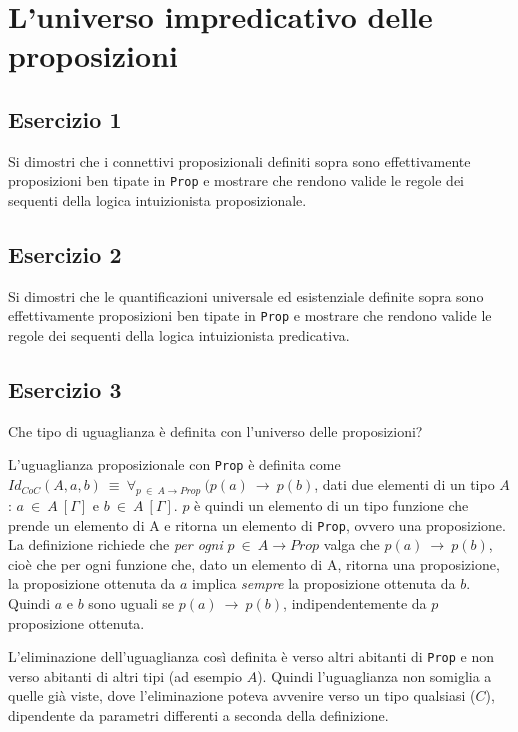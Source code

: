 \newpage
\section{L'universo impredicativo delle proposizioni}
\subsection{Esercizio 1}
\begin{thm}
	Si dimostri che i connettivi proposizionali definiti sopra sono effettivamente proposizioni ben tipate in \texttt{Prop} e mostrare che rendono valide le regole dei sequenti della logica intuizionista proposizionale.
\end{thm}


\subsection{Esercizio 2}
\begin{thm}
	Si dimostri che le quantificazioni universale ed esistenziale definite sopra sono effettivamente proposizioni ben tipate in \texttt{Prop} e mostrare che rendono valide le regole dei sequenti della logica intuizionista predicativa.
\end{thm}


\subsection{Esercizio 3}
\begin{thm}
	Che tipo di uguaglianza è definita con l'universo delle proposizioni?
\end{thm}
L'uguaglianza proposizionale con \texttt{Prop} è definita come $Id_{CoC}(A,a,b)~\equiv~\forall_{p~\in~A\to Prop}~(p(a)~\to~p(b)$, dati due  elementi di un tipo $A$: $a~\in~A~[\Gamma]$ e $b~\in~A~[\Gamma]$. $p$ è quindi un elemento di un tipo funzione che prende un elemento di A e ritorna un elemento di \texttt{Prop}, ovvero una proposizione. La definizione richiede che \textit{per ogni} $p~\in~A\to Prop$ valga che $p(a)~\to~p(b)$, cioè che per ogni funzione che, dato un elemento di A, ritorna una proposizione, la proposizione ottenuta da $a$ implica \textit{sempre} la proposizione ottenuta da $b$. Quindi $a$ e $b$ sono uguali se $p(a)~\to~p(b)$, indipendentemente da $p$ proposizione ottenuta.

L'eliminazione dell'uguaglianza così definita è verso altri abitanti di \texttt{Prop} e non verso abitanti di altri tipi (ad esempio $A$). Quindi l'uguaglianza non somiglia a quelle già viste, dove l'eliminazione poteva avvenire verso un tipo qualsiasi ($C$), dipendente da parametri differenti a seconda della definizione.

